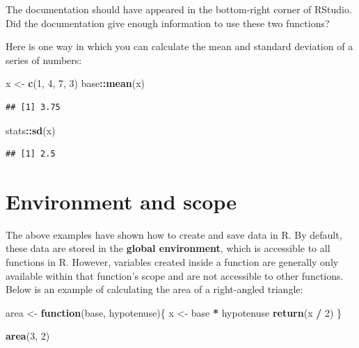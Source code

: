 \documentclass[
]{book}
\newenvironment{Shaded}{\begin{snugshade}}{\end{snugshade}}
\newcommand{\ControlFlowTok}[1]{\textcolor[rgb]{0.13,0.29,0.53}{\textbf{#1}}}
\newcommand{\DecValTok}[1]{\textcolor[rgb]{0.00,0.00,0.81}{#1}}
\newcommand{\FunctionTok}[1]{\textcolor[rgb]{0.13,0.29,0.53}{\textbf{#1}}}
\newcommand{\NormalTok}[1]{#1}
\newcommand{\OtherTok}[1]{\textcolor[rgb]{0.56,0.35,0.01}{#1}}
\newcommand{\SpecialCharTok}[1]{\textcolor[rgb]{0.81,0.36,0.00}{\textbf{#1}}}
\begin{document}
The documentation should have appeared in the bottom-right corner of RStudio. Did the documentation give enough information to use these two functions?

Here is one way in which you can calculate the mean and standard deviation of a series of numbers:

\begin{Shaded}
\begin{Highlighting}[]
\NormalTok{x }\OtherTok{\textless{}{-}} \FunctionTok{c}\NormalTok{(}\DecValTok{1}\NormalTok{, }\DecValTok{4}\NormalTok{, }\DecValTok{7}\NormalTok{, }\DecValTok{3}\NormalTok{)}
\NormalTok{base}\SpecialCharTok{::}\FunctionTok{mean}\NormalTok{(x)}
\end{Highlighting}
\end{Shaded}

\begin{verbatim}
## [1] 3.75
\end{verbatim}

\begin{Shaded}
\begin{Highlighting}[]
\NormalTok{stats}\SpecialCharTok{::}\FunctionTok{sd}\NormalTok{(x)}
\end{Highlighting}
\end{Shaded}

\begin{verbatim}
## [1] 2.5
\end{verbatim}

\section{Environment and scope}\label{sec:scope}

The above examples have shown how to create and save data in R. By default, these data are stored in the \textbf{global environment}, which is accessible to all functions in R. However, variables created inside a function are generally only available within that function's scope and are not accessible to other functions. Below is an example of calculating the area of a right-angled triangle:

\begin{Shaded}
\begin{Highlighting}[]
\NormalTok{area }\OtherTok{\textless{}{-}} \ControlFlowTok{function}\NormalTok{(base, hypotenuse)\{}
\NormalTok{  x }\OtherTok{\textless{}{-}}\NormalTok{ base }\SpecialCharTok{*}\NormalTok{ hypotenuse}
  \FunctionTok{return}\NormalTok{(x }\SpecialCharTok{/} \DecValTok{2}\NormalTok{)}
\NormalTok{\}}

\FunctionTok{area}\NormalTok{(}\DecValTok{3}\NormalTok{, }\DecValTok{2}\NormalTok{)}
\end{Highlighting}
\end{Shaded}
\end{document}
